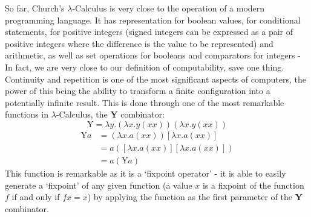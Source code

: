 \documentclass[Master.tex]{subfiles}
\begin{document}
So far, Church's $\lambda$-Calculus is very close to the operation of a modern programming language. It has representation for boolean values, for conditional statements, for positive integers (signed integers can be expressed as a pair of positive integers where the difference is the value to be represented) and arithmetic, as well as set operations for booleans and comparators for integers - In fact, we are very close to our definition of computability, save one thing. Continuity and repetition is one of the most significant aspects of computers, the power of this being the ability to transform a finite configuration into a potentially infinite result. This is done through one of the most remarkable functions in $\lambda$-Calculus, the \textbf{Y} combinator:
\cite{rojas2015lambdatutorial}
\begin{equation*}
\bm{\mathrm{Y}} = \lambda y.(\lambda x.y(xx))(\lambda x.y(xx))
\end{equation*}
\begin{equation*}
\begin{aligned}
\bm{\mathrm{Y}}a &= (\lambda x.a(xx))[\lambda x.a(xx)]\\
&= a([\lambda x.a(xx)][\lambda x.a(xx)])\\
&= a(\bm{\mathrm{Y}}a)
\end{aligned}
\end{equation*}
This function is remarkable as it is a `fixpoint operator' - it is able to easily generate a `fixpoint' of any given function (a value $x$ is a fixpoint of the function $f$ if and only if $fx = x$) by applying the function as the first parameter of the \textbf{Y} combinator.
\end{document}
